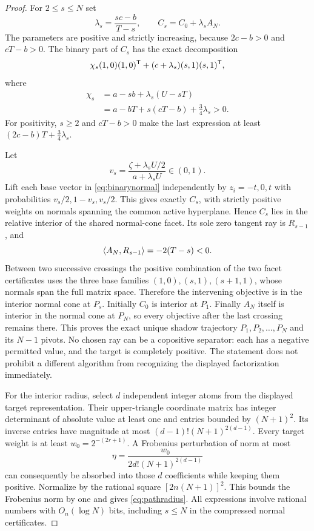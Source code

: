 \begin{proof}
For $2\le s\le N$ set
\begin{equation}\label{eq:lambda}
 \lambda_s=\frac{sc-b}{T-s},\qquad C_s=C_0+\lambda_s A_N.
\end{equation}
The parameters are positive and strictly increasing, because $2c-b>0$ and $cT-b>0$. The binary part of $C_s$ has the exact decomposition
\begin{equation}\label{eq:binarynormal}
 \chi_s(1,0)(1,0)^{\mathsf T}+(c+\lambda_s)(s,1)(s,1)^{\mathsf T},
\end{equation}
where
\begin{align*}
 \chi_s&=a-sb+\lambda_s(U-sT)\\
 &=a-bT+s(cT-b)+\tfrac34\lambda_s>0.
\end{align*}
For positivity, $s\ge2$ and $cT-b>0$ make the last expression at least $(2c-b)T+\tfrac34\lambda_s$.

Let
\[
 v_s=\frac{\zeta+\lambda_s U/2}{a+\lambda_s U}\in(0,1).
\]
Lift each base vector in \eqref{eq:binarynormal} independently by $z_i=-t,0,t$ with probabilities $v_s/2,1-v_s,v_s/2$. This gives exactly $C_s$, with strictly positive weights on normals spanning the common active hyperplane. Hence $C_s$ lies in the relative interior of the shared normal-cone facet. Its sole zero tangent ray is $R_{s-1}$, and
\[
 \langle A_N,R_{s-1}\rangle=-2(T-s)<0.
\]
Between two successive crossings the positive combination of the two facet certificates uses the three base families $(1,0),(s,1),(s+1,1)$, whose normals span the full matrix space. Therefore the intervening objective is in the interior normal cone at $P_s$. Initially $C_0$ is interior at $P_1$. Finally $A_N$ itself is interior in the normal cone at $P_N$, so every objective after the last crossing remains there. This proves the exact unique shadow trajectory $P_1,P_2,\ldots,P_N$ and its $N-1$ pivots. No chosen ray can be a copositive separator: each has a negative permitted value, and the target is completely positive. The statement does not prohibit a different algorithm from recognizing the displayed factorization immediately.

For the interior radius, select $d$ independent integer atoms from the displayed target representation. Their upper-triangle coordinate matrix has integer determinant of absolute value at least one and entries bounded by $(N+1)^2$. Its inverse entries have magnitude at most $(d-1)!(N+1)^{2(d-1)}$. Every target weight is at least $w_0=2^{-(2r+1)}$. A Frobenius perturbation of norm at most
\[
 \eta=\frac{w_0}{2d!(N+1)^{2(d-1)}}
\]
can consequently be absorbed into those $d$ coefficients while keeping them positive. Normalize by the rational square $[2n(N+1)]^2$. This bounds the Frobenius norm by one and gives \eqref{eq:pathradius}. All expressions involve rational numbers with $O_n(\log N)$ bits, including $s\le N$ in the compressed normal certificates.


\end{proof}
